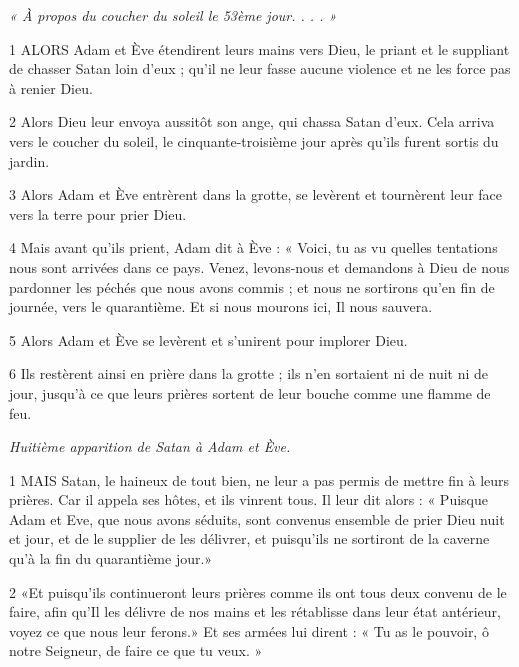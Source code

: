 
\par \textit{« À propos du coucher du soleil le 53ème jour. . . . »}

\par 1 ALORS Adam et Ève étendirent leurs mains vers Dieu, le priant et le suppliant de chasser Satan loin d'eux ; qu'il ne leur fasse aucune violence et ne les force pas à renier Dieu.

\par 2 Alors Dieu leur envoya aussitôt son ange, qui chassa Satan d'eux. Cela arriva vers le coucher du soleil, le cinquante-troisième jour après qu'ils furent sortis du jardin.

\par 3 Alors Adam et Ève entrèrent dans la grotte, se levèrent et tournèrent leur face vers la terre pour prier Dieu.

\par 4 Mais avant qu'ils prient, Adam dit à Ève : « Voici, tu as vu quelles tentations nous sont arrivées dans ce pays. Venez, levons-nous et demandons à Dieu de nous pardonner les péchés que nous avons commis ; et nous ne sortirons qu'en fin de journée, vers le quarantième. Et si nous mourons ici, Il nous sauvera.

\par 5 Alors Adam et Ève se levèrent et s'unirent pour implorer Dieu.

\par 6 Ils restèrent ainsi en prière dans la grotte ; ils n'en sortaient ni de nuit ni de jour, jusqu'à ce que leurs prières sortent de leur bouche comme une flamme de feu.


\par \textit{Huitième apparition de Satan à Adam et Ève.}

\par 1 MAIS Satan, le haineux de tout bien, ne leur a pas permis de mettre fin à leurs prières. Car il appela ses hôtes, et ils vinrent tous. Il leur dit alors : « Puisque Adam et Eve, que nous avons séduits, sont convenus ensemble de prier Dieu nuit et jour, et de le supplier de les délivrer, et puisqu'ils ne sortiront de la caverne qu'à la fin du quarantième jour.»

\par 2 «Et puisqu'ils continueront leurs prières comme ils ont tous deux convenu de le faire, afin qu'Il les délivre de nos mains et les rétablisse dans leur état antérieur, voyez ce que nous leur ferons.» Et ses armées lui dirent : « Tu as le pouvoir, ô notre Seigneur, de faire ce que tu veux. »

